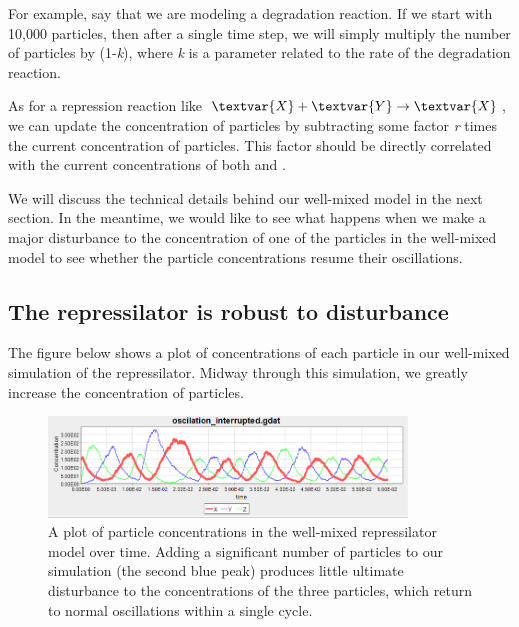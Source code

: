 For example, say that we are modeling a degradation reaction. If we start with 10,000  particles, then after a single time step, we will simply multiply the number of  particles by (1-\textit{k}), where \textit{k} is a parameter related to the rate of the degradation reaction.

As for a repression reaction like $\textvar{X} + \textvar{Y} \rightarrow \textvar{X}$, we can update the concentration of  particles by subtracting some factor \textit{r} times the current concentration of  particles. This factor should be directly correlated with the current concentrations of both  and .

We will discuss the technical details behind our well-mixed model in the next section. In the meantime, we would like to see what happens when we make a major disturbance to the concentration of one of the particles in the well-mixed model to see whether the particle concentrations resume their oscillations. 


\FloatBarrier
{}
\subsection{The repressilator is robust to disturbance}

The figure below shows a plot of concentrations of each particle in our well-mixed simulation of the repressilator.  Midway through this simulation, we greatly increase the concentration of  particles.

\begin{figure}[h]
\centering
\mySfFamily
\includegraphics[width = 0.85\textwidth]{../images/nf_sim_interrupted_chart.png}
\caption{A plot of particle concentrations in the well-mixed repressilator model over time. Adding a significant number of  particles to our simulation (the second blue peak) produces little ultimate disturbance to the concentrations of the three particles, which return to normal oscillations within a single cycle.}
\label{fig:nf_sim_interrupted_chart}
\end{figure}

